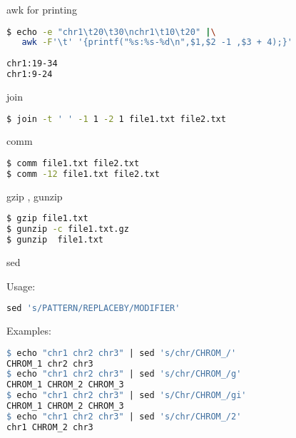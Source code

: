 \documentclass{beamer}
\begin{document}
\begin{frame}[fragile]
 \begin{center}
    \huge{awk for printing}\\
    \end{center}
\begin{lstlisting}[language=bash]
$ echo -e "chr1\t20\t30\nchr1\t10\t20" |\
   awk -F'\t' '{printf("%s:%s-%d\n",$1,$2 -1 ,$3 + 4);}'
  
chr1:19-34
chr1:9-24
\end{lstlisting}
\end{frame}

\begin{frame}[fragile]
 \begin{center}
    \huge{join}\\
    \end{center}
\begin{lstlisting}[language=bash]
$ join -t '	' -1 1 -2 1 file1.txt file2.txt
\end{lstlisting}
\end{frame}

\begin{frame}[fragile]
 \begin{center}
    \huge{comm}\\
    \end{center}
\begin{lstlisting}[language=bash]
$ comm file1.txt file2.txt
$ comm -12 file1.txt file2.txt
\end{lstlisting}
\end{frame}


\begin{frame}[fragile]
 \begin{center}
    \huge{gzip , gunzip}\\
    \end{center}
\begin{lstlisting}[language=bash]
$ gzip file1.txt
$ gunzip -c file1.txt.gz
$ gunzip  file1.txt
\end{lstlisting}
\end{frame}

\begin{frame}[fragile]
\begin{center}
    \huge{sed}\\
\end{center}
Usage:
\begin{lstlisting}[language=make]
sed 's/PATTERN/REPLACEBY/MODIFIER'
\end{lstlisting}
Examples:
\begin{lstlisting}[language=make]
$ echo "chr1 chr2 chr3" | sed 's/chr/CHROM_/'
CHROM_1 chr2 chr3
$ echo "chr1 chr2 chr3" | sed 's/chr/CHROM_/g'
CHROM_1 CHROM_2 CHROM_3
$ echo "chr1 chr2 chr3" | sed 's/Chr/CHROM_/gi'
CHROM_1 CHROM_2 CHROM_3
$ echo "chr1 chr2 chr3" | sed 's/chr/CHROM_/2'
chr1 CHROM_2 chr3
\end{lstlisting}
\end{frame}
\end{document}
